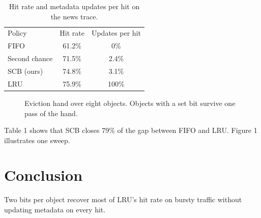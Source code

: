\documentclass{article}
\begin{document}
\begin{table}[h]
\caption{Hit rate and metadata updates per hit on the news trace.}
\begin{tabular}{lcc}
Policy & Hit rate & Updates per hit \\
FIFO & 61.2\% & 0\% \\
Second chance & 71.5\% & 2.4\% \\
SCB (ours) & 74.8\% & 3.1\% \\
LRU & 75.9\% & 100\% \\
\end{tabular}
\end{table}

\begin{figure}[h]
\caption{Eviction hand over eight objects. Objects with a set bit survive one pass of the hand.}
\end{figure}

Table 1 shows that SCB closes 79\% of the gap between FIFO and LRU. Figure 1 illustrates one sweep.

\section{Conclusion}
Two bits per object recover most of LRU's hit rate on bursty traffic without updating metadata on every hit.
\end{document}
